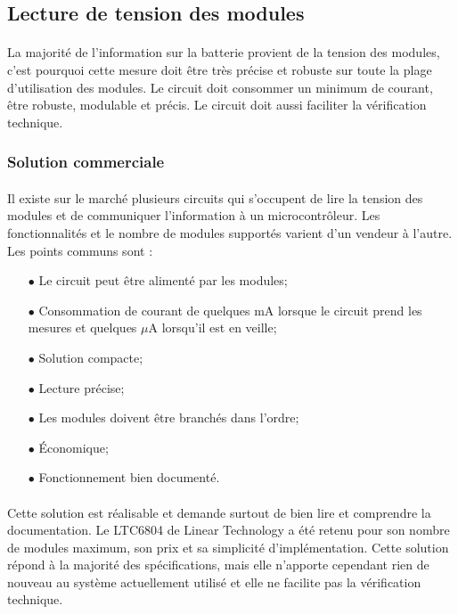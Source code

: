 \subsection{Lecture de tension des modules}
	\paragraph*{}
	La majorité de l'information sur la batterie provient de la tension des modules, c'est pourquoi cette mesure doit être très précise et robuste sur toute la plage d'utilisation des modules. Le circuit doit consommer un minimum de courant, être robuste, modulable et précis. Le circuit doit aussi faciliter la vérification technique.
	
	\subsubsection*{Solution commerciale}
	\paragraph*{}
	Il existe sur le marché plusieurs circuits qui s'occupent de lire la tension des modules et de communiquer l'information à un microcontrôleur. Les fonctionnalités et le nombre de modules supportés varient d'un vendeur à l'autre. Les points communs sont : 

	\begin{multicols}{2}
		\begin{itemize}
			\item[$\bullet$] Le circuit peut être alimenté par les modules;
			\item[$\bullet$] Consommation de courant de quelques mA lorsque le circuit prend les mesures et quelques $\mu$A lorsqu'il est en veille;
			\item[$\bullet$] Solution compacte;
			\item[$\bullet$] Lecture précise;
			\item[$\bullet$] Les modules doivent être branchés dans l'ordre;
			\item[$\bullet$] Économique;
			\item[$\bullet$] Fonctionnement bien documenté.
		\end{itemize}
	\end{multicols}

	\paragraph*{}
	Cette solution est réalisable et demande surtout de bien lire et comprendre la documentation. Le LTC6804 de Linear Technology a été retenu pour son nombre de modules maximum, son prix et sa simplicité d'implémentation. Cette solution répond à la majorité des spécifications, mais elle n'apporte cependant rien de nouveau au système actuellement utilisé et elle ne facilite pas la vérification technique. 
	

